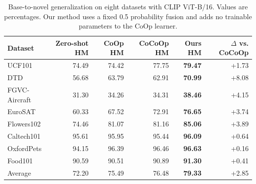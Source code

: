 \begin{table}[t]
\centering
\caption{Base-to-novel generalization on eight datasets with CLIP ViT-B/16. Values are percentages. Our method uses a fixed 0.5 probability fusion and adds no trainable parameters to the CoOp learner.}
\label{tab:eight-dataset-main}
\small
\setlength{\tabcolsep}{4.2pt}
\begin{tabular}{lrrrrr}
\toprule
Dataset & Zero-shot HM & CoOp HM & CoCoOp HM & Ours HM & $\Delta$ vs. CoCoOp \\
\midrule
UCF101        & 74.49 & 74.42 & 77.75 & \textbf{79.47} & +1.73 \\
DTD           & 56.68 & 63.79 & 62.91 & \textbf{70.99} & +8.08 \\
FGVC-Aircraft & 31.30 & 34.26 & 34.31 & \textbf{38.46} & +4.15 \\
EuroSAT       & 60.33 & 67.52 & 72.91 & \textbf{76.65} & +3.74 \\
Flowers102    & 74.46 & 81.07 & 81.16 & \textbf{85.06} & +3.89 \\
Caltech101    & 95.61 & 95.95 & 95.44 & \textbf{96.09} & +0.64 \\
OxfordPets    & 94.15 & 96.39 & 96.46 & \textbf{96.63} & +0.16 \\
Food101       & 90.59 & 90.51 & 90.89 & \textbf{91.30} & +0.41 \\
\midrule
Average       & 72.20 & 75.49 & 76.48 & \textbf{79.33} & +2.85 \\
\bottomrule
\end{tabular}
\end{table}
